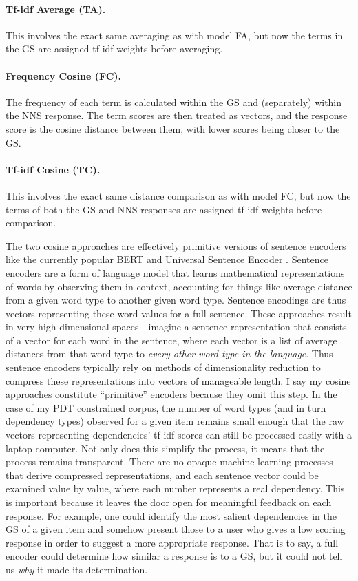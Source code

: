 \paragraph{Tf-idf Average (TA).} This involves the exact same
averaging as with model FA, but now the terms in the GS are assigned
tf-idf weights before averaging.

\paragraph{Frequency Cosine (FC).} The frequency of each term is
calculated within the GS and (separately) within the NNS response. 
The term scores are then treated as vectors, and the response score is
the cosine distance between them, with lower scores being closer to
the GS.

\paragraph{Tf-idf Cosine (TC).} This involves the exact same
distance comparison as with model FC, but now the terms of both the GS
and NNS responses are assigned tf-idf weights before comparison.

The two cosine approaches are effectively primitive versions of sentence encoders like the currently popular BERT \citep{BertDevlin2018} and Universal Sentence Encoder \citep{UniversalSentenceEncoder}. Sentence encoders are a form of language model that learns mathematical representations of words by observing them in context, accounting for things like average distance from a given word type to another given word type. Sentence encodings are thus vectors representing these word values for a full sentence. These approaches result in very high dimensional spaces---imagine a sentence representation that consists of a vector for each word in the sentence, where each vector is a list of average distances from that word type to \textit{every other word type in the language}. Thus sentence encoders typically rely on methods of dimensionality reduction to compress these representations into vectors of manageable length.
I say my cosine approaches constitute ``primitive'' encoders because they omit this step. In the case of my PDT constrained corpus, the number of word types (and in turn dependency types) observed for a given item remains small enough that the raw vectors representing dependencies' tf-idf scores can still be processed easily with a laptop computer. Not only does this simplify the process, it means that the process remains transparent. There are no opaque machine learning processes that derive compressed representations, and each sentence vector could be examined value by value, where each number represents a real dependency. This is important because it leaves the door open for meaningful feedback on each response. For example, one could identify the most salient dependencies in the GS of a given item and somehow present those to a user who gives a low scoring response in order to suggest a more appropriate response. That is to say, a full encoder could determine how similar a response is to a GS, but it could not tell us \textit{why} it made its determination.

